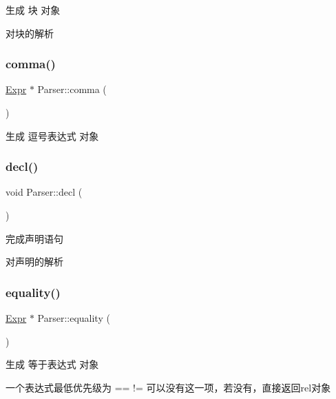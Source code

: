 生成 块 对象 

对块的解析 \mbox{\label{class_parser_abf18837a6acc9b543969706108d1191f}} 
\subsubsection{\texorpdfstring{comma()}{comma()}}
{\footnotesize\ttfamily \hyperlink{class_expr}{Expr} $\ast$ Parser\+::comma (\begin{DoxyParamCaption}{ }\end{DoxyParamCaption})\hspace{0.3cm}{\ttfamily [protected]}}



生成 逗号表达式 对象 

\mbox{\label{class_parser_a44a52c6402e86b0a200e02b516f8e9fe}} 
\subsubsection{\texorpdfstring{decl()}{decl()}}
{\footnotesize\ttfamily void Parser\+::decl (\begin{DoxyParamCaption}{ }\end{DoxyParamCaption})\hspace{0.3cm}{\ttfamily [protected]}}



完成声明语句 

对声明的解析 \mbox{\label{class_parser_acf81bd28478a78855da7271b0dd7a09d}} 
\subsubsection{\texorpdfstring{equality()}{equality()}}
{\footnotesize\ttfamily \hyperlink{class_expr}{Expr} $\ast$ Parser\+::equality (\begin{DoxyParamCaption}{ }\end{DoxyParamCaption})\hspace{0.3cm}{\ttfamily [protected]}}



生成 等于表达式 对象 

一个表达式最低优先级为 == != 可以没有这一项，若没有，直接返回rel对象\mbox{\label{class_parser_a0915f6c61a1a70038a8608ff7a823b5a}} 
